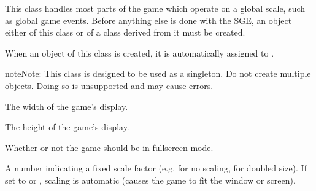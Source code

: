 \documentclass[letterpaper,10pt,english]{sphinxmanual}
\begin{document}
\begin{fulllineitems}
\label{dsp:sge.dsp.Game}
This class handles most parts of the game which operate on a global
scale, such as global game events.  Before anything else is done
with the SGE, an object either of this class or of a class derived
from it must be created.

When an object of this class is created, it is automatically
assigned to .

\begin{notice}{note}{Note:}
This class is designed to be used as a singleton.  Do not create
multiple {\hyperref[dsp:sge.dsp.Game]{\emph{}}} objects.  Doing so is unsupported
and may cause errors.
\end{notice}

\begin{fulllineitems}
\label{dsp:sge.dsp.Game.width}
The width of the game's display.

\end{fulllineitems}


\begin{fulllineitems}
\label{dsp:sge.dsp.Game.height}
The height of the game's display.

\end{fulllineitems}


\begin{fulllineitems}
\label{dsp:sge.dsp.Game.fullscreen}
Whether or not the game should be in fullscreen mode.

\end{fulllineitems}


\begin{fulllineitems}
\label{dsp:sge.dsp.Game.scale}
A number indicating a fixed scale factor (e.g.  for no
scaling,  for doubled size).  If set to  or
, scaling is automatic (causes the game to fit the window or
screen).


\end{fulllineitems}
\end{fulllineitems}
\end{document}
